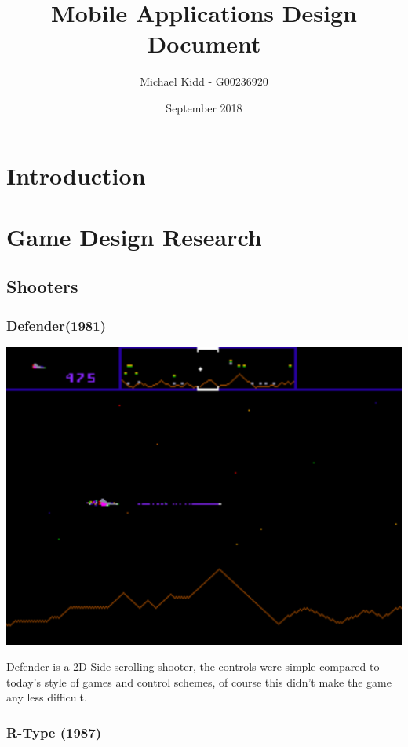 \documentclass{article}
\title{Mobile Applications Design Document}
\author{Michael Kidd - G00236920}
\date{September 2018}
\begin{document}
 
\maketitle
\clearpage

\tableofcontents
\clearpage
 
\section{Introduction}
\section{Game Design Research}

\clearpage

\subsection{Shooters}
\subsubsection{Defender(1981)}

\includegraphics [scale=0.38]{defender} \newline

Defender is a 2D Side scrolling shooter, the controls were simple compared to today's style of games and control schemes, of course this didn't make the game any less difficult.

\clearpage

\subsubsection{R-Type (1987)}
\end{document}
